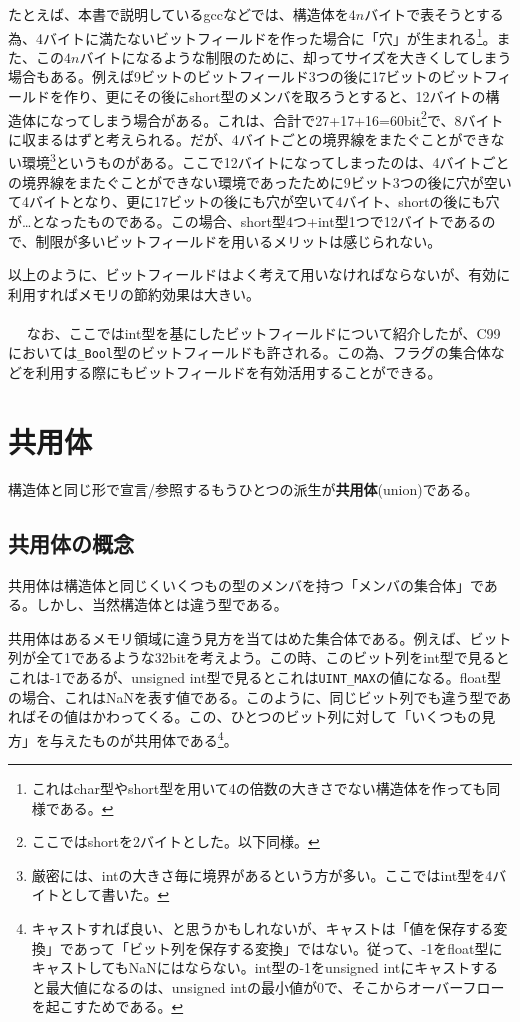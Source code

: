 たとえば、本書で説明しているgccなどでは、構造体を$4n$バイトで表そうとする為、4バイトに満たないビットフィールドを作った場合に「穴」が生まれる\footnote{これはchar型やshort型を用いて4の倍数の大きさでない構造体を作っても同様である。}。また、この$4n$バイトになるような制限のために、却ってサイズを大きくしてしまう場合もある。例えば9ビットのビットフィールド3つの後に17ビットのビットフィールドを作り、更にその後にshort型のメンバを取ろうとすると、12バイトの構造体になってしまう場合がある。これは、合計で27+17+16=60bit\footnote{ここではshortを2バイトとした。以下同様。}で、8バイトに収まるはずと考えられる。だが、4バイトごとの境界線をまたぐことができない環境\footnote{厳密には、intの大きさ毎に境界があるという方が多い。ここではint型を4バイトとして書いた。}というものがある。ここで12バイトになってしまったのは、4バイトごとの境界線をまたぐことができない環境であったために9ビット3つの後に穴が空いて4バイトとなり、更に17ビットの後にも穴が空いて4バイト、shortの後にも穴が…となったものである。この場合、short型4つ+int型1つで12バイトであるので、制限が多いビットフィールドを用いるメリットは感じられない。

以上のように、ビットフィールドはよく考えて用いなければならないが、有効に利用すればメモリの節約効果は大きい。
\\ \\　
なお、ここではint型を基にしたビットフィールドについて紹介したが、C99においては\verb|_Bool|型のビットフィールドも許される。この為、フラグの集合体などを利用する際にもビットフィールドを有効活用することができる。

\section{共用体}
構造体と同じ形で宣言/参照するもうひとつの派生が\textbf{共用体}(union)である。
\subsection{共用体の概念}
共用体は構造体と同じくいくつもの型のメンバを持つ「メンバの集合体」である。しかし、当然構造体とは違う型である。

共用体はあるメモリ領域に違う見方を当てはめた集合体である。例えば、ビット列が全て1であるような32bitを考えよう。この時、このビット列をint型で見るとこれは-1であるが、unsigned int型で見るとこれは\verb|UINT_MAX|の値になる。float型の場合、これはNaNを表す値である。このように、同じビット列でも違う型であればその値はかわってくる。この、ひとつのビット列に対して「いくつもの見方」を与えたものが共用体である\footnote{キャストすれば良い、と思うかもしれないが、キャストは「値を保存する変換」であって「ビット列を保存する変換」ではない。従って、-1をfloat型にキャストしてもNaNにはならない。int型の-1をunsigned intにキャストすると最大値になるのは、unsigned intの最小値が0で、そこからオーバーフローを起こすためである。}。

